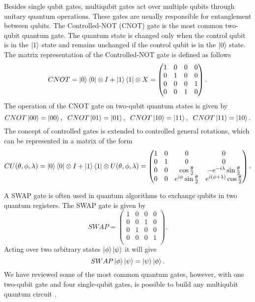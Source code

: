 \documentclass[10pt]{article}
\begin{document}
	Besides single qubit gates, multiqubit gates act over multiple qubits through unitary quantum operations. These gates are usually responsible for entanglement between qubits. The Controlled-NOT (CNOT) gate is the most common two-qubit quantum gate. The quantum state is changed only when the control qubit is in the $\ket{1}$ state and remains unchanged if the control qubit is in the $\ket{0}$  state. The matrix representation of the Controlled-NOT gate is defined as follows
	\begin{equation}
		CNOT=\ket{0}\bra{0}\otimes I+\ket{1}\bra{1}\otimes X=\begin{pmatrix}
			1 &0&0&0 \\
			0 &1&0&0 \\
			0 &0&0&1 \\
			0 &0&1&0 \\
		\end{pmatrix}.
	\end{equation}
	The operation of the CNOT gate on two-qubit quantum states is given by
	\begin{equation}
		CNOT\ket{00}=\ket{00}, \hspace{0.2cm}  CNOT\ket{01}=\ket{01}, \hspace{0.2cm}  CNOT\ket{10}=\ket{11}, \hspace{0.2cm}  CNOT\ket{11}=\ket{10}.
	\end{equation}
	The concept of controlled gates is extended to controlled general rotations, which can be represented in a matrix of the form
	\begin{equation}
		CU(\theta,\phi,\lambda)=\ket{0}\bra{0}\otimes I+\ket{1}\bra{1}\otimes U(\theta,\phi,\lambda)=\begin{pmatrix}
			1 &0&0&0 \\
			0 &1&0&0 \\
			0 &0&\cos\frac{\theta}{2}& -e^{-i\lambda}\sin\frac{\theta}{2} \\
			0 &0&e^{i\phi}\sin\frac{\theta}{2}& e^{i(\phi + \lambda)}\cos\frac{\theta}{2}\\
		\end{pmatrix}.
	\end{equation}
	
	A SWAP gate is often used in quantum algorithms to exchange qubits in two quantum registers. The SWAP gate is given by
	\begin{equation}
		SWAP = \begin{pmatrix}
			1&0&0&0 \\
			0&0&1&0 \\
			0&1&0&0 \\
			0&0&0&1\\
		\end{pmatrix}.
	\end{equation}
	Acting over two arbitrary states $\ket{\phi}\ket{\psi}$ it will give
	\begin{equation}
		SWAP\ket{\phi}\ket{\psi} = \ket{\psi}\ket{\phi}.
	\end{equation}
	We have reviewed some of the most common quantum gates, however, with one two-qubit gate and four single-qubit gates, is possible to build any multiqubit quantum circuit \citep{Divicenzo1995UniversalQGates}.
\end{document}
